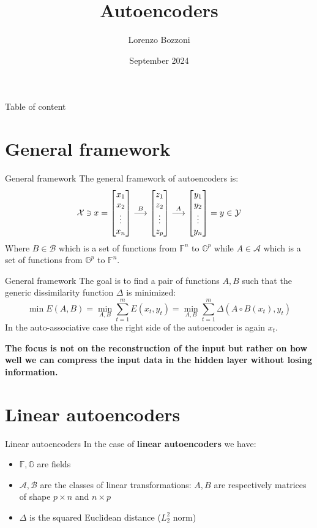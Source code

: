 \documentclass[9pt]{beamer}
\title{Autoencoders}
\author{Lorenzo Bozzoni}
\institute{Politecnico di Milano}
\date{September 2024}
\newcommand{\revin}{\mathbin{\rotatebox[origin=c]{180}{$\in$}}}
\begin{document}
\frame{\titlepage}



\begin{frame}{Table of content}
    \tableofcontents
\end{frame}


\section{General framework}
\begin{frame}{General framework}
The general framework of autoencoders is:
\[
\mathcal{X} \revin x = 
\begin{bmatrix}
    x_1\\
    x_2\\
    \vdots\\
    x_n
\end{bmatrix}
\overset{B}{\longrightarrow}
\begin{bmatrix}
    z_1\\
    z_2\\
    \vdots\\
    z_p
\end{bmatrix}
\overset{A}{\longrightarrow}
\begin{bmatrix}
    y_1\\
    y_2\\
    \vdots\\
    y_n
\end{bmatrix}
= y \in \mathcal{Y}
\]
Where $B \in \mathcal{B}$ which is a set of functions from $\mathbb{F}^n$ to $\mathbb{G}^p$ while $A \in \mathcal{A}$ which is a set of functions from $\mathbb{G}^p$ to $\mathbb{F}^n$.
\end{frame}

\begin{frame}{General framework}
The goal is to find a pair of functions $A,B$ such that the generic dissimilarity function $\Delta$ is minimized:
\[
\min E(A,B) = \min_{A,B} \sum_{t=1}^m E(x_t,y_t) = \min_{A,B} \sum_{t=1}^m \Delta(A \circ B(x_t),y_t)  
\]
In the auto-associative case the right side of the autoencoder is again $x_t$.

\textbf{The focus is not on the reconstruction of the input but rather on how well we can compress the input data in the hidden layer without losing information.}
\end{frame}


\section{Linear autoencoders}
\begin{frame}{Linear autoencoders}
In the case of \textbf{linear autoencoders} we have:
\begin{itemize}
    \item $\mathbb{F},\mathbb{G}$ are fields
    \item $\mathcal{A},\mathcal{B}$ are the classes of linear transformations: $A,B$ are respectively matrices of shape $p \times n$ and $n \times p$
    \item $\Delta$ is the squared Euclidean distance ($L_2^2$ norm)
\end{itemize}
\end{frame}
\end{document}
